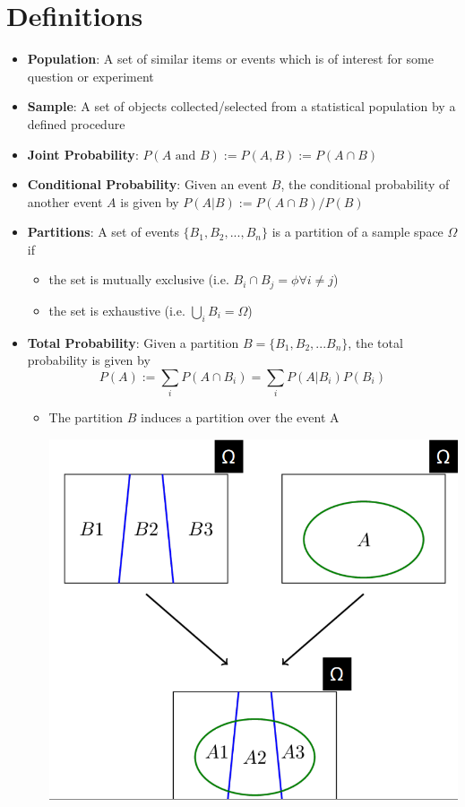 \documentclass{report}
\begin{document}
\section{Definitions}
\begin{itemize}
  \item \textbf{Population}: A set of similar items or events which is of interest for some question or experiment
  \item \textbf{Sample}: A set of objects collected/selected from a statistical population by a defined procedure
  \item \textbf{Joint Probability}: $P(A \text{ and } B) := P(A,B) := P(A\cap B)$
  \item \textbf{Conditional Probability}: Given an event $B$, the conditional probability of another event $A$ is given by $P(A|B) := P(A\cap B)/P(B)$
  \item \textbf{Partitions}: A set of events $\{B_1,B_2,...,B_n\}$ is a partition of a sample space $\Omega$ if
        \begin{itemize}
          \item the set is mutually exclusive (i.e. $B_i\cap B_j = \phi \forall i\neq j$)
          \item the set is exhaustive (i.e. $\underset{i}{\bigcup}{B_i} = \Omega$)
        \end{itemize}
  \item \textbf{Total Probability}: Given a partition $B = \{B_1,B_2,...B_n\}$, the total probability is given by $$P(A) := \underset{i}{\sum} P(A\cap B_i) = \underset{i}{\sum} P(A|B_i)P(B_i)$$
        \begin{itemize}
          \item The partition $B$ induces a partition over the event A
                \begin{center}
                  \includegraphics[scale=0.4]{"images/prob-02.png"}

\end{center}
\end{itemize}
\end{itemize}
\end{document}
